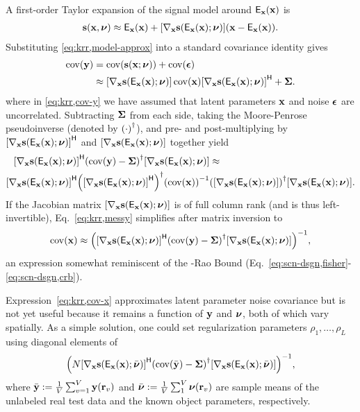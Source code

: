A first-order Taylor expansion
of the signal model
around $\expect{\bmx}{\bmx}$ is
\begin{align}
	\bms\paren{\bmx,\bmnu} \approx \expect{\bmx}{\bmx} + 
		\gradxs \paren{\bmx - \expect{\bmx}{\bmx}}.
	\label{eq:krr,model-approx}
\end{align}
Substituting \eqref{eq:krr,model-approx}
into a standard covariance identity gives
\begin{align}
	\cov{\bmy} 
		&= 
			\cov{\bms\paren{\bmx;\bmnu}} + \cov{\bmeps}
			\label{eq:krr,cov-y} \\
		&\approx 
			\gradxs \cov{\bmx} \gradxs\ctpose + \bmSig.
			\label{eq:krr,cov-y,approx}
\end{align}
where in \eqref{eq:krr,cov-y} we have assumed
that latent parameters $\mathbf{x}$
and noise $\boldsymbol{\epsilon}$ are uncorrelated. 
Subtracting $\boldsymbol{\Sigma}$ from each side,
taking the Moore-Penrose pseudoinverse 
(denoted by $\pinv{\cdot}$),
and pre- and post-multiplying
by $\gradxs\ctpose$ and $\gradxs$ together yield
\begin{align}
	\gradxs\ctpose \pinv{\cov{\bmy}-\bmSig} \gradxs &\approx 
		\label{eq:krr,messy} \\
	\gradxs\ctpose \pinv{\gradxs\ctpose} \inv{\cov{\bmx}} &\pinv{\gradxs} \gradxs.
		\nonumber
\end{align}
If the Jacobian matrix $\gradxs$ 
is of full column rank
(and is thus left-invertible), 
Eq.~\eqref{eq:krr,messy} simplifies
after matrix inversion to
\begin{align}
	\cov{\bmx} \approx \inv{\gradxs\ctpose \pinv{\cov{\bmy}-\bmSig} \gradxs},
	\label{eq:krr,cov-x}
\end{align}
an expression somewhat reminiscent
of the \Cramer-Rao Bound 
(\cf Eq.~\eqref{eq:scn-dsgn,fisher}-\eqref{eq:scn-dsgn,crb}).

Expression~\eqref{eq:krr,cov-x} approximates
latent parameter noise covariance 
but is not yet useful
because it remains a function 
of $\mathbf{y}$ and $\boldsymbol{\nu}$,
both of which vary spatially.
As a simple solution,
one could set regularization parameters $\rho_1,\dots,\rho_L$
using diagonal elements of
\begin{align}
	\inv{N \gradxvs\ctpose \pinv{\cov{\bar{\bmy}}-\bmSig} \gradxvs},
	\label{eq:krr,cov-x,approx}
\end{align}
where 
$\bar{\bmy} := \frac{1}{V} \sum_{v=1}^V \bmy\paren{\bmr_v}$
and 
$\nubar := \frac{1}{V} \sum_1^V \bmnu\paren{\bmr_v}$
are sample means
of the unlabeled real test data
and the known object parameters,
respectively.

